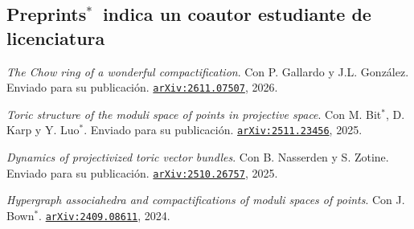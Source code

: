 \documentclass[11pt]{article}
\newcommand{\arxiv}[1]{\href{https://arxiv.org/abs/#1}{\texttt{arXiv:#1}}}
\newcommand{\ug}{$^{*}$}   %
\newcommand{\pubspacing}{\setlength{\itemsep}{3pt}\setlength{\parsep}{0pt}\raggedright}
\begin{document}
\subsection*{Preprints\hfill{\normalfont\small \ug\ indica un coautor estudiante de licenciatura}}
\begin{etaremune}[start=12]\pubspacing
  \item \emph{The Chow ring of a wonderful compactification}.
        Con P. Gallardo y J.L. González. Enviado para su publicación. \arxiv{2611.07507}, 2026.

  \item \emph{Toric structure of the moduli space of points in projective space}.
        Con M. Bit\ug, D. Karp y Y. Luo\ug. Enviado para su publicación. \arxiv{2511.23456}, 2025.

  \item \emph{Dynamics of projectivized toric vector bundles}.
        Con B. Nasserden y S. Zotine. Enviado para su publicación. \arxiv{2510.26757}, 2025.

  \item \emph{Hypergraph associahedra and compactifications of moduli spaces of points}.
        Con J. Bown\ug. \arxiv{2409.08611}, 2024.
\end{etaremune}
\end{document}
